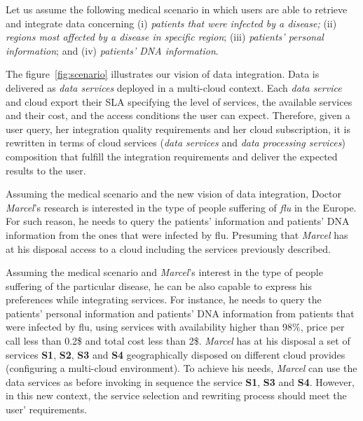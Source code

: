 Let us assume the following medical scenario in which users are able to retrieve and integrate data concerning (i) \textit{patients that were infected by a disease;}
(ii) \textit{regions most affected by a disease in specific region}; (iii)
\textit{patients' personal information}; and (iv) \textit{patients' DNA
information}.

The figure~\ref{fig:scenario} illustrates our vision of data integration. Data is delivered as \textit{data services} deployed in a multi-cloud context. Each \textit{data service} and cloud export their SLA specifying the level of services, the available services and their cost, and the access conditions the user can expect. Therefore, given a user query, her integration quality requirements and her cloud subscription, it is rewritten in terms of cloud services (\textit{data services} and \textit{data processing services}) composition that fulfill the integration requirements and deliver the expected results to the user.

Assuming the medical scenario and the new vision of data integration, Doctor \textit{Marcel}'s research is interested in the type of people suffering of \textit{flu} in the Europe. For such reason, he needs to query the patients'
information and patients' DNA information from the ones that were infected by
flu. Presuming that \textit{Marcel} has at his disposal access to a cloud
including the services previously described.

Assuming the medical scenario and \textit{Marcel}'s interest in the type of people
suffering of the particular disease, he can be
also capable to express his preferences while integrating services. For instance, he needs to query the patients' personal information and patients' DNA information from patients that were infected by flu, using services with availability higher than 98\%, price per call less than 0.2\$ and total cost less than 2\$.
\textit{Marcel} has at his disposal a set of services \textbf{S1}, \textbf{S2}, \textbf{S3} and \textbf{S4} geographically disposed on different cloud provides (configuring a multi-cloud environment).
To achieve his needs, \textit{Marcel} can use the data services as before invoking in sequence the service \textbf{S1}, \textbf{S3} and \textbf{S4}. However, in this new context, the service selection and rewriting process should meet the user' requirements.   